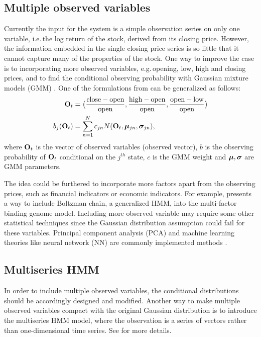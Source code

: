 \subsection{Multiple observed variables}
\label{sec:system:improvement:variable}
Currently the input for the system is a simple observation series on only one variable,
i.e.\,the log return of the stock, derived from its closing price.
However, the information embedded in the single closing price series is so little 
that it cannot capture many of the properties of the stock.
One way to improve the case is to incorporating more observed variables,
e.g.\,opening, low, high and closing prices, 
and to find the conditional observing probability with Gaussian mixture models (GMM)
\cite{Hassan:2005uw,Gupta:2012gm,Brailovskiy:2014wu}.
One of the formulations from \cite{Gupta:2012gm} can be generalized as follows:
		\begin{subequations}
		\begin{align}
		{\mathbf O}_t & = \big( \frac{\text{close} - \text{open}}{\text{open}},
					  \frac{\text{high} - \text{open}}{\text{open}},
					  \frac{\text{open} - \text{low}}{\text{open}} \big) \\
		b_j({\mathbf O}_t) & = \sum_{n = 1}^{N} c_{jn} N({\mathbf O}_t,{\boldsymbol\mu}_{jn},{\boldsymbol\sigma}_{jn}),
		\end{align}
		\end{subequations}
where ${\mathbf O}_t$ is the vector of observed variables (observed vector),
$b$ is the observing probability of ${\mathbf O}_{t}$ conditional on the $j^{th}$ state,
$c$ is the GMM weight and ${\boldsymbol\mu}, {\boldsymbol\sigma}$ are GMM parameters.

The idea could be furthered to incorporate more factors apart from the observing prices,
such as financial indicators or economic indicators.
For example, \cite{Wasson:2009dh} presents a way to include Boltzman chain, 
a generalized HMM, into the multi-factor binding genome model.
Including more observed variable may require some other statistical techniques 
since the Gaussian distribution assumption could fail for these variables.
Principal component analysis (PCA) and machine learning theories like neural network (NN)
are commonly implemented methods \cite{Bengio:1992ke,Tipping:1999db,Hassan:2007hk}.


\subsection{Multiseries HMM}
\label{sec:system:improvement:series}
In order to include multiple observed variables, 
the conditional distributions should be accordingly designed and modified.
Another way to make multiple observed variables compact with the original Gaussian distribution
is to introduce the multiseries HMM model,
where the observation is a series of vectors rather than one-dimensional time series.
See \cite{Zucchini:2009df} for more details.


